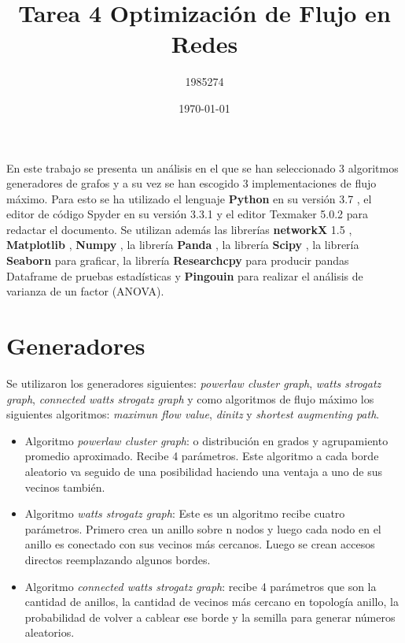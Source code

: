 \documentclass{article}
\begin{document}
\title{Tarea 4 Optimización de Flujo en Redes}
\author{1985274}
\date{\today}
\maketitle 

\maketitle

En este trabajo se presenta un análisis en el que se han seleccionado 3 algoritmos generadores de grafos y a su vez se han escogido 3 implementaciones de flujo máximo. Para esto se ha utilizado el lenguaje \textbf{Python} en su versión 3.7 \cite{python}, el editor de código Spyder en su versión 3.3.1 y el editor Texmaker 5.0.2 para redactar el documento. Se utilizan además las librerías \textbf{networkX} 1.5 \cite{networkx}, \textbf{Matplotlib} \cite{matplotlib}, \textbf{Numpy}  \cite{numpy}, la librería \textbf{Panda} \cite{panda}, la librería \textbf{Scipy} \cite{scipy}, la librería \textbf{Seaborn} \cite{seaborn} para graficar, la librería \textbf{Researchcpy} \cite{researchcpy} para producir pandas Dataframe de pruebas estadísticas y \textbf{Pingouin} \cite{pingouin} para realizar el análisis de varianza de un factor (ANOVA). 

\section{Generadores}  
Se utilizaron los generadores siguientes: \textit{powerlaw cluster graph}, \textit{watts strogatz graph}, \textit{connected watts strogatz graph} y como algoritmos de flujo máximo los siguientes algoritmos: \textit{maximun flow value}, \textit{dinitz} y \textit{shortest augmenting path}.

\begin{itemize}
  \item Algoritmo \textit{powerlaw cluster graph}: o distribución en grados y agrupamiento promedio
   aproximado. Recibe 4 parámetros. Este algoritmo a cada borde aleatorio va seguido de una posibilidad haciendo una ventaja a uno de sus vecinos también.  
  \item Algoritmo \textit{watts strogatz graph}: Este es un algoritmo recibe cuatro parámetros. Primero crea un anillo sobre n nodos y luego cada nodo en el anillo es conectado con sus vecinos más cercanos. Luego se crean accesos directos 
       reemplazando algunos bordes.
  \item Algoritmo \textit{connected watts strogatz graph}: recibe 4 parámetros que son la cantidad de anillos, la cantidad de vecinos más cercano en topología anillo, la probabilidad de volver a cablear ese borde y la semilla para generar números aleatorios. 
\end{itemize}
\end{document}
